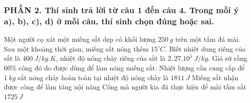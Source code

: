 \subsubsection*{PHẦN 2. Thí sinh trả lời từ câu 1 đến câu 4. Trong mỗi ý a), b), c), d) ở mỗi câu, thí sinh chọn đúng hoặc sai.}
\setcounter{ex}{0}
\begin{ex}%
	Một người cọ xát một miếng sắt dẹp có khối lượng $250\ g$ trên một tấm đá mài. Sau một khoảng thời gian, miếng sắt nóng thêm $15^\circ C$. Biết nhiệt dung riêng của sắt là $460\ J/kg.K$, nhiệt độ nóng chảy riêng của sắt là $2,27.10^5\ J/kg$. Giả sử rằng $60\%$ công đó do được dùng để làm nóng miếng sắt.
	{Nhiệt lượng cần cung cấp để $1\ kg$ sắt nóng chảy hoàn toàn tại nhiệt độ nóng chảy là $1811\ J$}
	{\True Miếng sắt nhận được công để làm tăng nội năng}
	{Công mà người kia đã thực hiện để mài tấm sắt $1725\ J$}
\end{ex}

